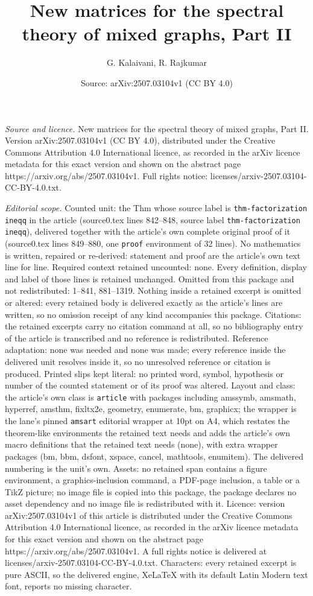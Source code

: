 \documentclass[10pt,a4paper]{amsart}
\title[New matrices for the spectral theory of mixed graphs, Part I]{New matrices for the spectral theory of mixed graphs, Part II}
\author{G. Kalaivani, R. Rajkumar}
\date{Source: arXiv:2507.03104v1 (CC BY 4.0)}
\begin{document}
\maketitle

\noindent\emph{Source and licence.} New matrices for the spectral theory of mixed graphs, Part II. Version arXiv:2507.03104v1 (CC BY 4.0), distributed under the Creative Commons Attribution 4.0 International licence, as recorded in the arXiv licence metadata for this exact version and shown on the abstract page https://arxiv.org/abs/2507.03104v1. Full rights notice: licenses/arxiv-2507.03104-CC-BY-4.0.txt.\par\smallskip

\noindent\textit{Editorial scope.} Counted unit: the Thm whose source label is \texttt{thm-factorization ineqq} in the article (source0.tex lines 842--848, source label \texttt{thm-factorization ineqq}), delivered together with the article's own complete original proof of it (source0.tex lines 849--880, one \texttt{proof} environment of 32 lines). No mathematics is written, repaired or re-derived: statement and proof are the article's own text line for line. Required context retained uncounted: none. Every definition, display and label of those lines is retained unchanged. Omitted from this package and not redistributed: 1--841, 881--1319. Nothing inside a retained excerpt is omitted or altered: every retained body is delivered exactly as the article's lines are written, so no omission receipt of any kind accompanies this package. Citations: the retained excerpts carry no citation command at all, so no bibliography entry of the article is transcribed and no reference is redistributed. Reference adaptation: none was needed and none was made; every reference inside the delivered unit resolves inside it, so no unresolved reference or citation is produced. Printed slips kept literal: no printed word, symbol, hypothesis or number of the counted statement or of its proof was altered. Layout and class: the article's own class is \texttt{article} with packages including amssymb, amsmath, hyperref, amsthm, fixltx2e, geometry, enumerate, bm, graphicx; the wrapper is the lane's pinned \texttt{amsart} editorial wrapper at 10pt on A4, which restates the theorem-like environments the retained text needs and adds the article's own macro definitions that the retained text needs (none), with extra wrapper packages (bm, bbm, dsfont, xspace, cancel, mathtools, enumitem). The delivered numbering is the unit's own. Assets: no retained span contains a figure environment, a graphics-inclusion command, a PDF-page inclusion, a table or a TikZ picture; no image file is copied into this package, the package declares no asset dependency and no image file is redistributed with it. Licence: version arXiv:2507.03104v1 of this article is distributed under the Creative Commons Attribution 4.0 International licence, as recorded in the arXiv licence metadata for this exact version and shown on the abstract page https://arxiv.org/abs/2507.03104v1. A full rights notice is delivered at licenses/arxiv-2507.03104-CC-BY-4.0.txt. Characters: every retained excerpt is pure ASCII, so the delivered engine, XeLaTeX with its default Latin Modern text font, reports no missing character.
\end{document}
